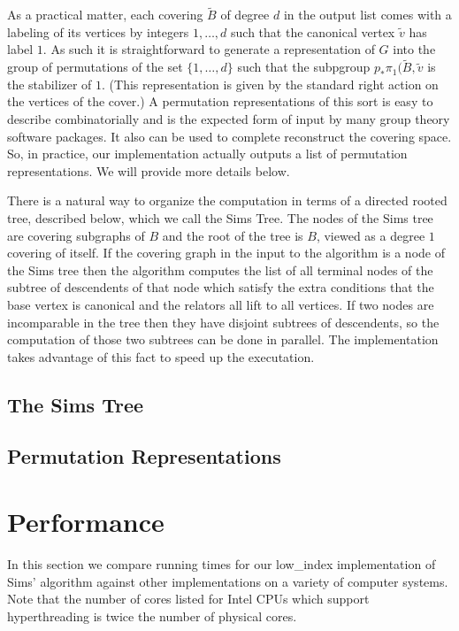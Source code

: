 \documentclass[12pt]{article}
\theoremstyle{definition}
\renewcommand{\tilde}{\widetilde}
\begin{document}
    As a practical matter, each covering $\tilde B$ of degree $d$ in the output
    list comes with a labeling of its vertices by integers $1, \ldots, d$ such
    that the canonical vertex $\tilde v$ has label $1$.  As such it is straightforward to
    generate a representation of $G$ into the group of permutations of the set
    $\{1, \ldots, d\}$ such that the subpgroup $p_*\pi_1(\tilde B, \tilde v$ is
    the stabilizer of $1$.  (This representation is given by the standard right action
    on the vertices of the cover.)  A permutation representations of this sort is
    easy to describe combinatorially and is the expected form of input by many
    group theory software packages.  It also can be used to complete reconstruct
    the covering space.  So, in practice, our implementation actually outputs a
    list of permutation representations.  We will provide more details below.
    
    There is a natural way to organize the computation in terms of a directed
    rooted tree, described below, which we call the Sims Tree.  The nodes of the
    Sims tree are covering subgraphs of $B$ and the root of the tree is $B$,
    viewed as a degree $1$ covering of itself.  If the covering graph in the
    input to the algorithm is a node of the Sims tree then the algorithm
    computes the list of all terminal nodes of the subtree of descendents of
    that node which satisfy the extra conditions that the base vertex is
    canonical and the relators all lift to all vertices.  If two nodes are
    incomparable in the tree then they have disjoint subtrees of descendents, so
    the computation of those two subtrees can be done in parallel.  The
    implementation takes advantage of this fact to speed up the executation.
    
   \subsection{The Sims Tree}

   \subsection{Permutation Representations}

\section{Performance}
  In this section we compare running times for our low\_index implementation
  of Sims'  algorithm against other implementations on a variety of computer
  systems.  Note that the number of cores listed for Intel CPUs which support
  hyperthreading is twice the number of physical cores.
\end{document}
